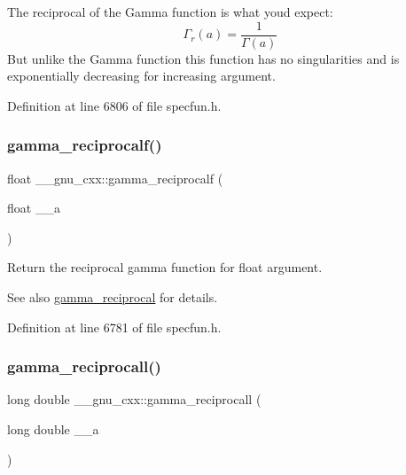 The reciprocal of the Gamma function is what you\textquotesingle{}d expect\+: \[ \Gamma_r(a) = \frac{1}{\Gamma(a)} \] But unlike the Gamma function this function has no singularities and is exponentially decreasing for increasing argument. 

Definition at line 6806 of file specfun.\+h.

\mbox{\label{group__gnu__math__spec__func_ga10cccd5045490ac24590c094c43107d8}} 
\subsubsection{\texorpdfstring{gamma\+\_\+reciprocalf()}{gamma\_reciprocalf()}}
{\footnotesize\ttfamily float \+\_\+\+\_\+gnu\+\_\+cxx\+::gamma\+\_\+reciprocalf (\begin{DoxyParamCaption}\item[{float}]{\+\_\+\+\_\+a }\end{DoxyParamCaption})\hspace{0.3cm}{\ttfamily [inline]}}

Return the reciprocal gamma function for {\ttfamily  float } argument.

\begin{DoxySeeAlso}{See also}
\hyperlink{group__gnu__math__spec__func_ga641f9bcdb8fc32a9a0ce7a15b5040076}{gamma\+\_\+reciprocal} for details. 
\end{DoxySeeAlso}


Definition at line 6781 of file specfun.\+h.

\mbox{\label{group__gnu__math__spec__func_ga73bfcace13daa8b50e7e7e3f583a2eb0}} 
\subsubsection{\texorpdfstring{gamma\+\_\+reciprocall()}{gamma\_reciprocall()}}
{\footnotesize\ttfamily long double \+\_\+\+\_\+gnu\+\_\+cxx\+::gamma\+\_\+reciprocall (\begin{DoxyParamCaption}\item[{long double}]{\+\_\+\+\_\+a }\end{DoxyParamCaption})\hspace{0.3cm}{\ttfamily [inline]}}

